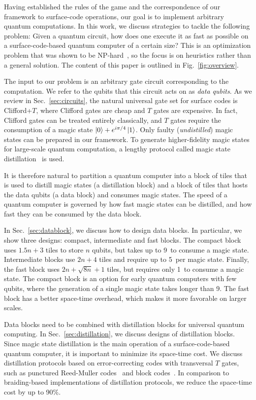 \documentclass[prx,aps,letterpaper,twocolumn,allowfontchageintitle=true,accepted=2019-02-01]{quantumarticle}
\begin{document}
Having established the rules of the game and the correspondence of our framework to surface-code operations, our goal is to implement arbitrary quantum computations. In this work, we discuss strategies to tackle the following problem: Given a quantum circuit, how does one execute it as fast as possible on a surface-code-based quantum computer of a certain size? This is an optimization problem that was shown to be NP-hard~\cite{Herr2017b}, so the focus is on heuristics rather than a general solution. The content of this paper is outlined in Fig.~\ref{fig:overview}.

The input to our problem is an arbitrary gate circuit corresponding to the computation. We refer to the qubits that this circuit acts on as \textit{data qubits}. As we review in Sec.~\ref{sec:circuits}, the natural universal gate set for surface codes is Clifford+$T$, where Clifford gates are cheap and $T$ gates are expensive. In fact, Clifford gates can be treated entirely classically, and $T$ gates require the consumption of a magic state $\ket{0} + e^{i\pi/4} \ket{1}$. Only faulty (\textit{undistilled}) magic states can be prepared in our framework. To generate higher-fidelity magic states for large-scale quantum computation, a lengthy protocol called magic state distillation~\cite{Bravyi2005} is used.

It is therefore natural to partition a quantum computer into a block of tiles that is used to distill magic states (a distillation block) and a block of tiles that hosts the data qubits (a data block) and consumes magic states. The speed of a quantum computer is governed by how fast magic states can be distilled, and how fast they can be consumed by the data block.

In Sec.~\ref{sec:datablock}, we discuss how to design data blocks. In particular, we show three designs: compact, intermediate and fast blocks. The compact block uses $1.5n+3$ tiles to store $n$ qubits, but takes up to 9\clock \ to consume a magic state. Intermediate blocks use $2n+4$ tiles and require up to 5\clock \ per magic state. Finally, the fast block uses $2n+\sqrt{8n}+1$ tiles, but requires only 1\clock \ to consume a magic state. The compact block is an option for early quantum computers with few qubits, where the generation of a single magic state takes longer than 9\clock. The fast block has a better space-time overhead, which makes it more favorable on larger scales.

Data blocks need to be combined with distillation blocks for universal quantum computing. In Sec.~\ref{sec:distillation}, we discuss designs of distillation blocks. Since magic state distillation is the main operation of a surface-code-based quantum computer, it is important to minimize its space-time cost. We discuss distillation protocols based on error-correcting codes with transversal $T$ gates, such as punctured Reed-Muller codes~\cite{Bravyi2005,Haah2018} and block codes~\cite{Bravyi2012,Jones2013a,Fowler2013}. In comparison to braiding-based implementations of distillation protocols, we reduce the space-time cost by up to 90\%.
\end{document}
